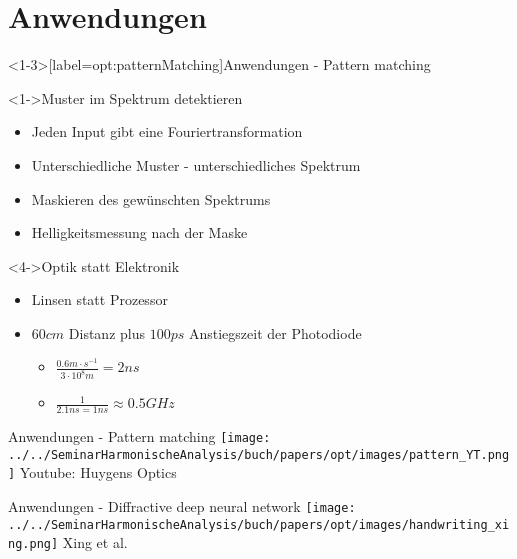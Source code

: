 \section{Anwendungen}

\begin{frame}<1-3>[label=opt:patternMatching]{Anwendungen - Pattern matching}
    \begin{block}<1->{Muster im Spektrum detektieren}
        \begin{itemize}
            \item<1-> Jeden Input gibt eine Fouriertransformation
            \item<1-> Unterschiedliche Muster - unterschiedliches Spektrum
            \item<2-> Maskieren des gewünschten Spektrums
            \item<3-> Helligkeitsmessung nach der Maske
        \end{itemize}
    \end{block}
    \begin{block}<4->{Optik statt Elektronik}
        \begin{itemize}
            \item<4-> Linsen statt Prozessor
            \item<5-> $60 cm$ Distanz plus $100 ps$ Anstiegszeit der Photodiode
            \begin{itemize}
                \item $\frac{0.6 m \cdot s^{-1}}{3 \cdot 10^8 m} = 2 ns$
                \item $\frac{1}{2.1 ns = 1 ns} \approx 0.5 GHz$
            \end{itemize}
        \end{itemize}
    \end{block}
\end{frame}

\begin{frame}{Anwendungen - Pattern matching}
    \centering
    \texttt{[image: ../../SeminarHarmonischeAnalysis/buch/papers/opt/images/pattern\_YT.png]}
    \vfill
    Youtube: Huygens Optics \cite{opt:YT:PatternRecognition}
\end{frame}


\begin{frame}{Anwendungen - Diffractive deep neural network}
    \centering
    \texttt{[image: ../../SeminarHarmonischeAnalysis/buch/papers/opt/images/handwriting\_xing.png]}
    \vfill
    Xing et al. \cite{opt:Lin.2018}
\end{frame}

